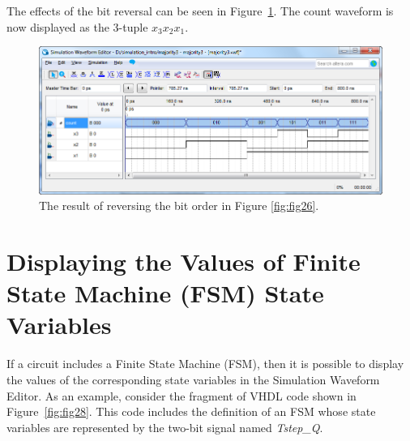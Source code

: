 \documentclass[11pt, twoside, pdftex]{article}
\begin{document}
The effects of the bit reversal can be seen in Figure~\ref{fig:fig27}. The count waveform is now 
displayed as the 3-tuple $x_3 x_2 x_1$.
\begin{figure}[H]
   \begin{center}
      \includegraphics[scale=0.65]{figures/appendix/figure27.png}
   \caption{The result of reversing the bit order in Figure \ref{fig:fig26}.} 
	 \label{fig:fig27}
	 \end{center}
\end{figure} 	

\iffalse

\section{Displaying the Values of Finite State Machine (FSM) State Variables}
If a circuit includes a Finite State Machine (FSM), then it is possible to display the 
values of the corresponding state variables in the Simulation Waveform Editor. 
As an example, consider the fragment of VHDL code shown in Figure~\ref{fig:fig28}.
This code includes the definition of an FSM whose state variables are represented by the 
two-bit signal named {\it Tstep\_Q}. 
\end{document}
